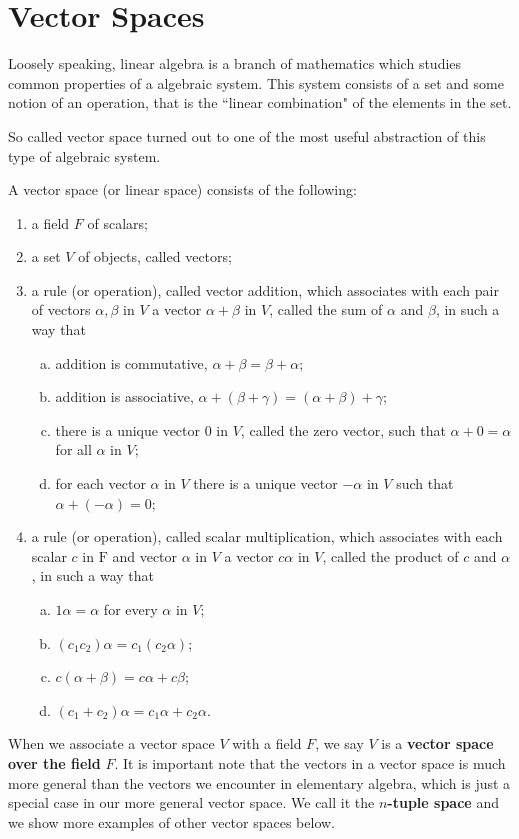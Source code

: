 \documentclass[../main.tex]{subfiles}
\begin{document}
\section{Vector Spaces}
Loosely speaking, linear algebra is a branch of mathematics which studies common properties of a algebraic system. This system consists of a set and some notion of an operation, that is the ``linear combination" of the elements in the set. 

So called vector space turned out to one of the most useful abstraction of this type of algebraic system. 
\begin{definition}
    A vector space (or linear space) consists of the following:
    \begin{enumerate}
        \item a field $F$ of scalars;
        \item a set $V$ of objects, called vectors;
        \item a rule (or operation), called vector addition, which associates with each pair of vectors $\alpha, \beta$ in $V$ a vector $\alpha+\beta$ in $V$, called the sum of $\alpha$ and $\beta$, in such a way that
        \begin{enumerate}[a.]
            \item addition is commutative, $\alpha+\beta=\beta+\alpha$;
            \item addition is associative, $\alpha+(\beta+\gamma)=(\alpha+\beta)+\gamma$;
            \item there is a unique vector 0 in $V$, called the zero vector, such that $\alpha+0=\alpha$ for all $\alpha$ in $V$;
            \item for each vector $\alpha$ in $V$ there is a unique vector $-\alpha$ in $V$ such that $\alpha+(-\alpha)=0$;
        \end{enumerate}
        \item a rule (or operation), called scalar multiplication, which associates with each scalar $c$ in $\mathrm{F}$ and vector $\alpha$ in $V$ a vector $c \alpha$ in $V$, called the product of $c$ and $\alpha$, in such a way that
        \begin{enumerate}[a.]
            \item $1 \alpha=\alpha$ for every $\alpha$ in $V$;
            \item $\left(c_1 c_2\right) \alpha=c_1\left(c_2 \alpha\right)$;
            \item $c(\alpha+\beta)=c \alpha+c \beta$;
            \item $\left(c_1+c_2\right) \alpha=c_1 \alpha+c_2 \alpha$.
        \end{enumerate}
    \end{enumerate}
\end{definition}
When we associate a vector space $V$ with a field $F$, we say $V$ is a \textbf{vector space over the field} $F$. It is important note that the vectors in a vector space is much more general than the vectors we encounter in elementary algebra, which is just a special case in our more general vector space. We call it the \textbf{$n$-tuple space} and we show more examples of other vector spaces below. 
\end{document}
